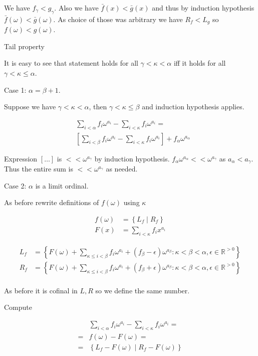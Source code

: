 \documentclass{article}
\newcommand{\brac}[1]{\left[ #1 \right]}
\newcommand{\curly}[1]{\left\{ #1 \right\}}
\newcommand{\R}{\mathbb{R}}
\newcommand{\w}{\omega}
\begin{document}
We have $f_\gamma < g_\gamma$.
Also  we have $\bar f(x) < \bar g(x)$ and thus by induction hypothesis $\bar f(\w) < \bar g(\w)$. As choice of those was arbitrary we have $R_f < L_g$ so $f(\w) < g(\w)$.

Tail property

It is easy to see that statement holds for all $\gamma < \kappa < \alpha$ iff it holds for all $\gamma < \kappa \leq \alpha$.

Case 1: $\alpha = \beta + 1$.

Suppose we have $\gamma < \kappa < \alpha$, then $\gamma < \kappa \leq \beta$ and induction hypothesis applies.

\begin{align*}
	&\sum_{i < \alpha} f_i \w^{a_i} - \sum_{i < \kappa} f_i \w^{a_i} = \\
	&\brac{\sum_{i < \beta} f_i \w^{a_i} - \sum_{i < \kappa} f_i \w^{a_i}} + f_\alpha \w^{a_\alpha}
\end{align*}

Expression $\brac{\ldots}$ is $<< \w^{a_\gamma}$ by induction hypothesis. $f_\alpha \w^{a_\alpha} << \w^{a_\gamma}$ as $a_\alpha < a_\gamma$. Thus the entire sum is $<< \w^{a_\gamma}$ as needed.

Case 2: $\alpha$ is a limit ordinal.

As before rewrite definitions of $f(\w)$ using $\kappa$

\begin{align*}
  f(\w) &= \curly{L_f \mid R_f} \\
  F(x) &= \sum_{i < \kappa} f_i x^{a_i}
\end{align*}

\begin{align*}
  L_f &= \curly{F(\w) + \sum_{\kappa \leq i < \beta} f_i \w^{a_i} + (f_\beta - \epsilon) \w^{a_\beta}
	\colon \kappa < \beta < \alpha, \epsilon \in \R^{>0}} \\
  R_f &= \curly{F(\w) + \sum_{\kappa \leq i < \beta} f_i \w^{a_i} + (f_\beta + \epsilon) \w^{a_\beta}
	\colon \kappa < \beta < \alpha, \epsilon \in \R^{>0}} \\
\end{align*}

As before it is cofinal in $L, R$ so we define the same number.

Compute

\begin{align*}
  &\sum_{i < \alpha} f_i \w^{a_i} - \sum_{i < \kappa} f_i \w^{a_i} = \\
	= &f(\w) - F(\w) = \\
	= &\curly{L_f - F(\w) \mid R_f - F(\w)}
\end{align*}
\end{document}
